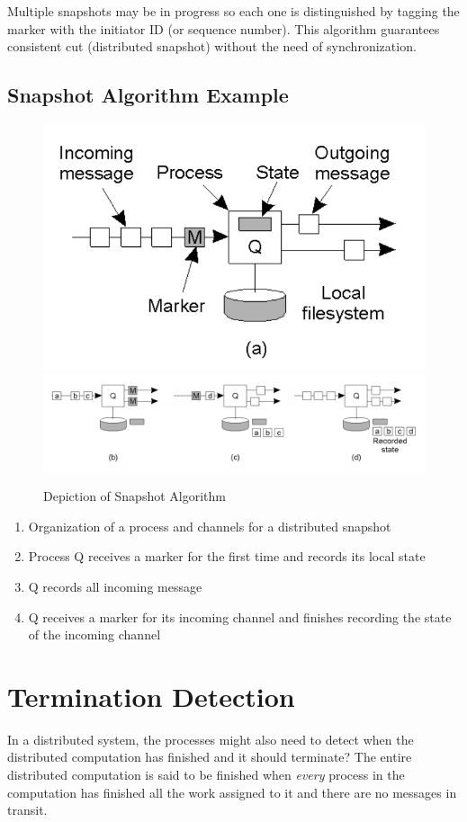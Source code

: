 \documentclass[twoside]{article}
\begin{document}
Multiple snapshots may be in progress so each one is distinguished by tagging the marker with the initiator ID (or sequence number).
This algorithm guarantees consistent cut (distributed snapshot) without the need of synchronization. 


\subsection{Snapshot Algorithm Example}
\begin{figure}[h!]
\centering
\includegraphics[scale=0.25]{./snapshot_1.png}
\includegraphics[scale=0.25]{./snapshot_2.png}
\caption{Depiction of Snapshot Algorithm}
\label{fig:bully}
\end{figure} 
\begin{enumerate}[label=(\alph*)]
\item Organization of a process and channels for a distributed snapshot
\item Process Q receives a marker for the first time and records its local state
\item Q records all incoming message
\item Q receives a marker for its incoming channel and finishes recording the state of the incoming channel
\end{enumerate}

\section{Termination Detection}
In a distributed system, the processes might also need to detect when the distributed computation has finished and it should terminate? The entire distributed computation is said to be finished when \emph{every} process in the computation has finished all the work assigned to it and there are no messages in transit. 
\end{document}

